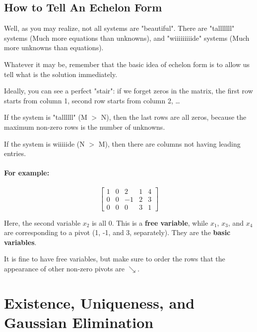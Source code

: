 \documentclass[11pt]{article}
\theoremstyle{definition}
\begin{document}
\subsection{How to Tell An Echelon Form}
Well, as you may realize, not all systems are "beautiful". There are "talllllll" systems (Much more equations than unknowns), and "wiiiiiiiiide" systems (Much more unknowns than equations).

Whatever it may be, remember that the basic idea of echelon form is to allow us tell what is the solution immediately. 

Ideally, you can see a perfect "stair": if we forget zeros in the matrix, the first row starts from column 1, second row starts from column 2, \dots

If the system is "tallllll" (M $>$ N), then the last rows are all zeros, because the maximum non-zero rows is the number of unknowns.

If the system is wiiiiide (N $>$ M), then there are columns not having leading entries. 

\paragraph{For example:}
\[
\left[
\begin{array}{cccc|c}
    1 & 0 & 2 & 1 & 4 \\
    0 & 0 & -1 & 2 & 3 \\
    0 & 0 & 0 & 3 & 1
\end{array}
\right]
\]

Here, the second variable $x_2$ is all 0. This is a \textbf{free variable}, while $x_1$, $x_3$, and $x_4$ are corresponding to a pivot (1, -1, and 3, separately). They are the \textbf{basic variables}. 

It is fine to have free variables, but make sure to order the rows that the appearance of other non-zero pivots are $\searrow$.

\vspace{0.5em}
\noindent{}


\section{Existence, Uniqueness, and Gaussian Elimination}
\end{document}
